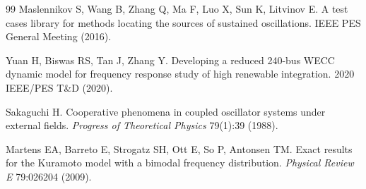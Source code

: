 \documentclass[11pt]{article}
\begin{document}
\begin{thebibliography}{99}
 Maslennikov S, Wang B, Zhang Q, Ma F, Luo X,
Sun K, Litvinov E. A test cases library for methods locating the sources
of sustained oscillations. IEEE PES General Meeting (2016).

 Yuan H, Biswas RS, Tan J, Zhang Y. Developing a
reduced 240-bus WECC dynamic model for frequency response study of high
renewable integration. 2020 IEEE/PES T\&D (2020).

 Sakaguchi H. Cooperative phenomena in coupled
oscillator systems under external fields. \emph{Progress of Theoretical
Physics} 79(1):39 (1988).

 Martens EA, Barreto E, Strogatz SH, Ott E, So P,
Antonsen TM. Exact results for the Kuramoto model with a bimodal
frequency distribution. \emph{Physical Review E} 79:026204 (2009).

\end{thebibliography}
\end{document}
